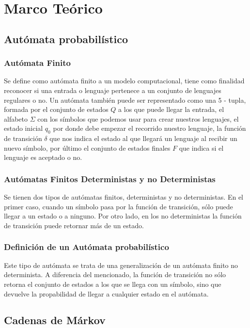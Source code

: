 \documentclass{article}
\begin{document}
\section{Marco Teórico}

\subsection{Autómata probabilístico}

\subsubsection{Autómata Finito}
Se define como autómata finito a un modelo computacional, tiene como finalidad reconocer si una entrada o lenguaje pertenece a un conjunto de lenguajes regulares o no. Un autómata también puede ser representado como una 5 - tupla, formada por el conjunto de estados $Q$ a los que puede llegar la entrada, el alfabeto $\Sigma$ con los símbolos que podemos usar para crear nuestros lenguajes, el estado inicial $q_0$ por donde debe empezar el recorrido nuestro lenguaje, la función de transición $\delta$ que nos indica el estado al que llegará un lenguaje al recibir un nuevo símbolo, por último el conjunto de estados finales $F$ que indica si el lenguaje es aceptado o no.

\subsubsection{Autómatas Finitos Deterministas y no Deterministas}

Se tienen dos tipos de autómatas finitos, deterministas y no deterministas. En el primer caso, cuando un símbolo pasa por la función de transición, sólo puede llegar a un estado o a ninguno. Por otro lado, en los no deterministas la función de transición puede retornar más de un estado.

\subsubsection{Definición de un Autómata probabilístico}

Este tipo de autómata se trata de una generalización de un autómata finito no determinista. A diferencia del mencionado, la función de transición no sólo retorna el conjunto de estados a los que se llega con un símbolo, sino que devuelve la propabilidad de llegar a cualquier estado en el autómata. 

\subsection{Cadenas de Márkov}
\end{document}
